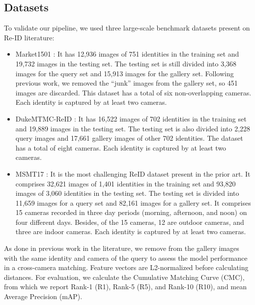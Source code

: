 \documentclass[journal]{IEEEtran}
\begin{document}
\subsection{Datasets}
\label{subsec:datasets}
To validate our pipeline, we used three large-scale benchmark datasets present on Re-ID literature:

\begin{itemize}
    \item Market1501 \cite{zheng2015scalable}: It has 12,936 images of 751 identities in the training set and 19,732 images in the testing set. The testing set is still divided into 3,368 images for the query set and 15,913 images for the gallery set. Following previous work, we removed the ``junk'' images from the gallery set, so 451 images are discarded. This dataset has a total of six non-overlapping cameras. Each identity is captured by at least two cameras.
    
    \item DukeMTMC-ReID \cite{ristani2016performance}: It has 16,522 images of 702 identities in the training set and 19,889 images in the testing set. The testing set is also divided into 2,228 query images and 17,661 gallery images of other 702 identities. The dataset has a total of eight cameras. Each identity is captured by at least two cameras. 


    \item MSMT17 \cite{wei2018person}: It is the most challenging ReID dataset present in the prior art. It comprises 32,621 images of 1,401 identities in the training set and 93,820 images of 3,060 identities in the testing set. The testing set is divided into 11,659 images for a query set and 82,161 images for a gallery set. It comprises 15 cameras recorded in three day periods (morning, afternoon, and noon) on four different days. Besides, of the 15 cameras, 12 are outdoor cameras, and three are indoor cameras. Each identity is captured by at least two cameras. 
    
\end{itemize}

As done in previous work in the literature, we remove from the gallery images with the same identity and camera of the query to assess the model performance in a cross-camera matching. Feature vectors are L2-normalized before calculating distances. For evaluation, we calculate the Cumulative Matching Curve (CMC), from which we report Rank-1 (R1), Rank-5 (R5), and Rank-10 (R10), and mean Average Precision (mAP).
\end{document}
